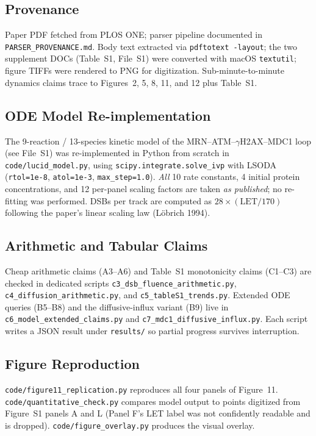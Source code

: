 \documentclass[11pt]{article}
\begin{document}
\subsection{Provenance}
Paper PDF fetched from PLOS ONE; parser pipeline documented in \texttt{PARSER\_PROVENANCE.md}.
Body text extracted via \verb|pdftotext -layout|; the two supplement DOCs (Table~S1, File~S1)
were converted with macOS \texttt{textutil}; figure TIFFs were rendered to PNG for digitization.
Sub-minute-to-minute dynamics claims trace to Figures~2, 5, 8, 11, and 12 plus Table~S1.

\subsection{ODE Model Re-implementation}
The 9-reaction / 13-species kinetic model of the MRN--ATM--$\gamma$H2AX--MDC1 loop
(see File~S1) was re-implemented in Python from scratch in
\texttt{code/lucid\_model.py}, using \texttt{scipy.integrate.solve\_ivp} with LSODA
(\texttt{rtol=1e-8}, \texttt{atol=1e-3}, \texttt{max\_step=1.0}).
\emph{All} 10 rate constants, 4 initial protein concentrations, and 12 per-panel scaling
factors are taken \emph{as published}; no re-fitting was performed. DSBs per track are
computed as $28 \times (\mathrm{LET}/170)$ following the paper's linear scaling law
(L\"obrich 1994).

\subsection{Arithmetic and Tabular Claims}
Cheap arithmetic claims (A3--A6) and Table~S1 monotonicity claims (C1--C3) are checked in
dedicated scripts \texttt{c3\_dsb\_fluence\_arithmetic.py},
\texttt{c4\_diffusion\_arithmetic.py}, and \texttt{c5\_tableS1\_trends.py}. Extended ODE queries
(B5--B8) and the diffusive-influx variant (B9) live in
\texttt{c6\_model\_extended\_claims.py} and \texttt{c7\_mdc1\_diffusive\_influx.py}. Each script
writes a JSON result under \texttt{results/} so partial progress survives interruption.

\subsection{Figure Reproduction}
\texttt{code/figure11\_replication.py} reproduces all four panels of Figure~11.
\texttt{code/quantitative\_check.py} compares model output to points digitized from Figure~S1
panels A and L (Panel F's LET label was not confidently readable and is dropped).
\texttt{code/figure\_overlay.py} produces the visual overlay.
\end{document}
